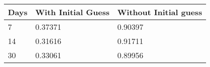 \begin{tabular}{lll}
Days & With Initial Guess & Without Initial guess \\ 
\hline 
7 & 0.37371 & 0.90397 \\ 
14 & 0.31616 & 0.91711 \\ 
30 & 0.33061 & 0.89956 \\ 
\hline 
\end{tabular}
